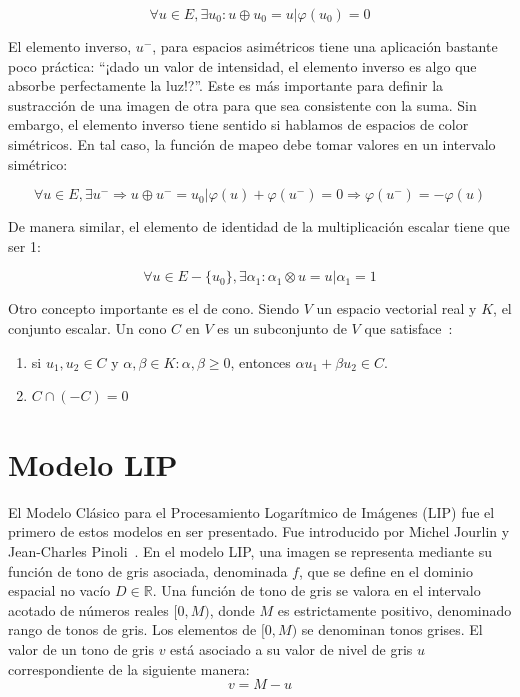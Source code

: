 \begin{equation}
	\forall u\in E, \exists u_0 : u \oplus u_0 = u | \varphi(u_0)=0
\end{equation}

El elemento inverso, $u^-$, para espacios asimétricos tiene una aplicación bastante poco práctica: ``\textquestiondown¡dado un valor de intensidad, el elemento inverso es algo que absorbe perfectamente la luz!?''. Este es más importante para definir la sustracción de una imagen de otra para que sea consistente con la suma. Sin embargo, el elemento inverso tiene sentido si hablamos de espacios de color simétricos. En tal caso, la función de mapeo debe tomar valores en un intervalo simétrico:

\begin{equation}
	\forall u \in E, \exists u^- \Rightarrow u \oplus u^- = u_0 | \varphi(u) + \varphi(u^-) = 0 \Rightarrow \varphi(u^-)=-\varphi(u) 
\end{equation}

De manera similar, el elemento de identidad de la multiplicación escalar tiene que ser 1:

\begin{equation}
	\forall u \in E - \{u_0\}, \exists \alpha_1 : \alpha_1 \otimes u = u | \alpha_1 = 1
\end{equation}

Otro concepto importante es el de cono. Siendo $V$ un espacio vectorial real y $K$, el conjunto escalar. Un cono $C$ en $V$ es un subconjunto de $V$ que satisface~\cite{barker1981theory}:

\begin{enumerate}
	\item si $u_1,u_2\in C$ y $\alpha,\beta\in K:\alpha,\beta\geq0$, entonces $\alpha u_1+\beta u_2\in C$.
	\item $C \cap (-C)={0}$
\end{enumerate}

\section{Modelo LIP}

El Modelo Cl\'asico para el Procesamiento Logar\'itmico de Im\'agenes (LIP) fue el primero de estos modelos en ser presentado. Fue introducido por Michel Jourlin y Jean-Charles Pinoli~\cite{jourlin1988model}. En el modelo LIP, una imagen se representa mediante su función de tono de gris asociada, denominada $f$, que se define en el dominio espacial no vacío $D \in \mathbb{R}$. Una función de tono de gris se valora en el intervalo acotado de números reales $[0, M)$, donde $M$ es estrictamente positivo, denominado rango de tonos de gris. Los elementos de $[0, M )$ se denominan tonos grises. El valor de un tono de gris $v$ est\'a asociado a su valor de nivel de gris $u$ correspondiente de la siguiente manera:
\begin{equation}
	v = M - u
\end{equation}

